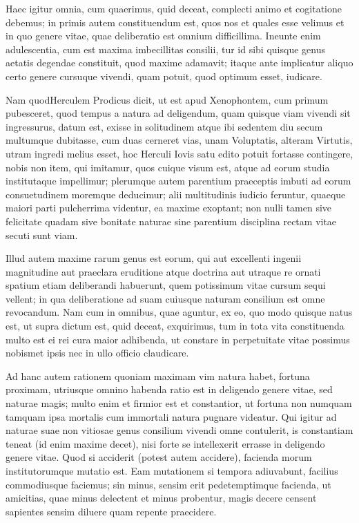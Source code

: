  Haec igitur omnia, cum quaerimus, quid deceat, complecti animo et cogitatione debemus; in primis autem constituendum est, quos nos et quales esse velimus et in quo genere vitae, quae deliberatio est omnium difficillima. Ineunte enim adulescentia, cum est maxima imbecillitas consilii, tur id sibi quisque genus aetatis degendae constituit, quod maxime adamavit; itaque ante implicatur aliquo certo genere cursuque vivendi, quam potuit, quod optimum esset, iudicare.

 Nam quodHerculem Prodicus dicit, ut est apud Xenophontem, cum primum pubesceret, quod tempus a natura ad deligendum, quam quisque viam vivendi sit ingressurus, datum est, exisse in solitudinem atque ibi sedentem diu secum multumque dubitasse, cum duas cerneret vias, unam Voluptatis, alteram Virtutis, utram ingredi melius esset, hoc Herculi Iovis satu edito potuit fortasse contingere, nobis non item, qui imitamur, quos cuique visum est, atque ad eorum studia institutaque impellimur; plerumque autem parentium praeceptis imbuti ad eorum consuetudinem moremque deducimur; alii multitudinis iudicio feruntur, quaeque maiori parti pulcherrima videntur, ea maxime exoptant; non nulli tamen sive felicitate quadam sive bonitate naturae sine parentium disciplina rectam vitae secuti sunt viam.

 Illud autem maxime rarum genus est eorum, qui aut excellenti ingenii magnitudine aut praeclara eruditione atque doctrina aut utraque re ornati spatium etiam deliberandi habuerunt, quem potissimum vitae cursum sequi vellent; in qua deliberatione ad suam cuiusque naturam consilium est omne revocandum. Nam cum in omnibus, quae aguntur, ex eo, quo modo quisque natus est, ut supra dictum est, quid deceat, exquirimus, tum in tota vita constituenda multo est ei rei cura maior adhibenda, ut constare in perpetuitate vitae possimus nobismet ipsis nec in ullo officio claudicare.

 Ad hanc autem rationem quoniam maximam vim natura habet, fortuna proximam, utriusque omnino habenda ratio est in deligendo genere vitae, sed naturae magis; multo enim et firmior est et constantior, ut fortuna non numquam tamquam ipsa mortalis cum immortali natura pugnare videatur. Qui igitur ad naturae suae non vitiosae genus consilium vivendi omne contulerit, is constantiam teneat (id enim maxime decet), nisi forte se intellexerit errasse in deligendo genere vitae. Quod si acciderit (potest autem accidere), facienda morum institutorumque mutatio est. Eam mutationem si tempora adiuvabunt, facilius commodiusque faciemus; sin minus, sensim erit pedetemptimque facienda, ut amicitias, quae minus delectent et minus probentur, magis decere censent sapientes sensim diluere quam repente praecidere.

